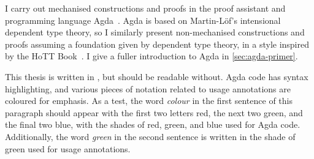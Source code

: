 I carry out mechanised constructions and proofs in the proof assistant and
programming language Agda~\citep{Agda}.
Agda is based on Martin-L\"{o}f's intensional dependent type theory, so I
similarly present non-mechanised constructions and proofs assuming a foundation
given by dependent type theory, in a style inspired by the HoTT
Book~\citep{hottbook}.
I give a fuller introduction to Agda in \cref{sec:agda-primer}.

This thesis is written in \colour{}, but should be readable without.
Agda code has syntax highlighting, and various pieces of notation related to
usage annotations are coloured  for emphasis.
As a test, the word \emph{colour} in the first sentence of this paragraph should
appear with the first two letters red, the next two green, and the final two
blue, with the shades of red, green, and blue used for Agda code.
Additionally, the word \emph{green} in the second sentence is written in the
shade of green used for usage annotations.
